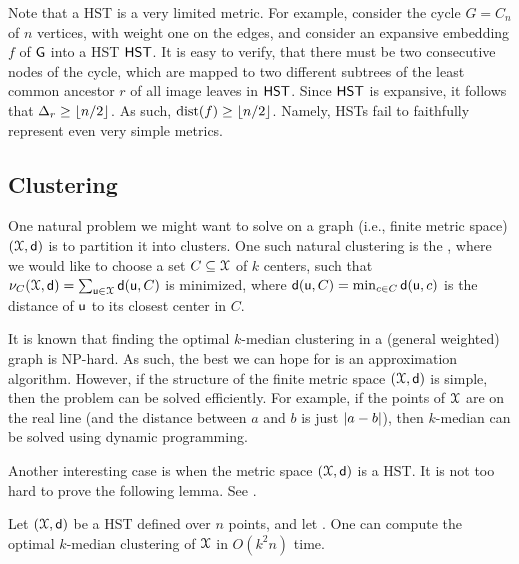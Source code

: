 Note that a HST is a very limited metric. For example, consider the
cycle $G = C_n$ of $n$ vertices, with weight one on the edges, and
consider an expansive embedding $f$ of $\mathsf{G}$ into a HST $\HST$. It is easy
to verify, that there must be two consecutive nodes of the cycle, which
are mapped to two different subtrees of the least common ancestor $r$ of all image leaves in $\HST$. Since
$\HST$ is expansive, it follows that $\Delta_r \geq \left\lfloor {n/2} \right\rfloor$. As such,
$\mathrm{dist}(f) \geq \left\lfloor {n/2} \right\rfloor$. Namely, HSTs fail to faithfully represent even
very simple metrics.

 


\subsection{Clustering}

One natural problem we might want to solve on a graph (i.e., finite
metric space) $(\FMS,\DistChar)$ is to partition it into clusters. One
such natural clustering is the , where we
would like to choose a set $C \subseteq \FMS$ of $k$ centers, such
that
$\MdPrc_C(\FMS,\DistChar) = \sum_{\pntA \in \FMS} \DistChar(\pntA, C)$
is minimized, where
$\mathsf{d}(\mathsf{u},C) = \min_{c \in C} \mathsf{d}(\mathsf{u}, c)$ is the
distance of $\mathsf{u}$ to its closest center in $C$.

It is known that finding the optimal $k$-median clustering in a
(general weighted) graph is NP-hard. As such, the best we can hope
for is an approximation algorithm. However, if the structure of the
finite metric space $(\FMS,\DistChar)$ is simple, then the problem can be
solved efficiently. For example, if the points of $\FMS$ are on the
real line (and the distance between $a$ and $b$ is just
$\left| {a-b} \right|$), then $k$-median can be solved using dynamic
programming.

Another interesting case is when the metric space $(\FMS,\DistChar)$ is a
HST. It is not too hard to prove the following lemma. See
.
\begin{lemma}
    Let $(\FMS,\DistChar)$ be a HST defined over $n$ points, and let
    .
    One can compute the optimal $k$-median
    clustering of $\FMS$ in $O(k^2 n )$ time.

\end{lemma}

